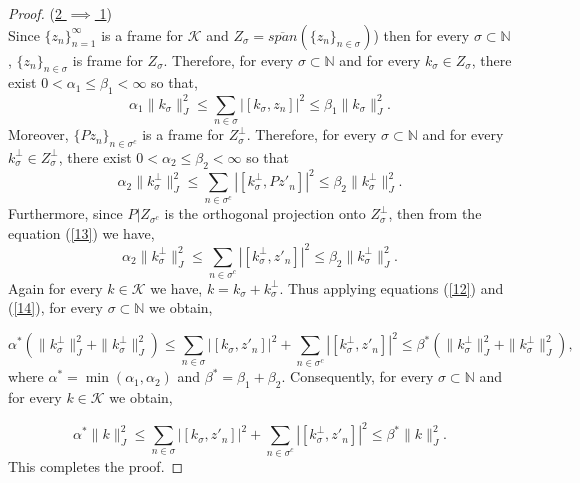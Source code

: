 \documentclass[10pt,a4paper]{amsart}
\begin{document}
\begin{proof}
	\noindent  (\underline{2 $\implies$ 1})\\
	Since $\{z_n\}_{n=1}^\infty$ is a frame  for $\mathcal{K}$ and $ Z_\sigma = \overline{span}(\{z_n\}_{n\in \sigma})$) then for every $\sigma \subset\mathbb{N}$,
	$\{z_n\}_{n\in \sigma}$ is frame for $Z_\sigma.$
	Therefore, for every $\sigma\subset \mathbb{N}$ and for every $k_\sigma \in Z_\sigma$, there exist $0<\alpha_1\leq \beta_1< \infty$ so that, 
	\begin{equation}\label{12}
	\alpha_1 \|k_\sigma\|_{J}^2 \leq \sum\limits_{n \in \sigma} |[k_\sigma, z_n]|^2  \leq \beta_1 \|k_\sigma\|_{J}^2.
	\end{equation}
	Moreover, $\{Pz_n\}_{n \in \sigma^c}$ is a frame for $Z^\perp_{\sigma}.$ Therefore, for every $\sigma\subset \mathbb{N}$ and for every $k^\perp_{\sigma} \in Z^\perp_\sigma$, there exist $0<\alpha_2\leq \beta_2< \infty$ so that
	\begin{equation}\label{13}
		\alpha_2\|k_\sigma^\perp\|_{J}^2 \leq \sum\limits_{n \in \sigma^c} |[k_\sigma^\perp, Pz'_n]|^2  \leq \beta_2 \|k_\sigma^\perp\|_{J}^2.
	\end{equation}
		Furthermore, since $P|Z_{\sigma^c}$ is the orthogonal projection  onto $Z^\perp_{\sigma}$, then from the equation (\ref{13}) we have,
		\begin{equation}\label{14}
		\alpha_2\|k_\sigma^\perp\|_{J}^2 \leq \sum\limits_{n \in \sigma^c} |[k_\sigma^\perp, z'_n]|^2  \leq \beta_2 \|k_\sigma^\perp\|_{J}^2.
	\end{equation}
	Again for every $k \in \mathcal{K}$ we have, $k = k_\sigma + k^\perp_\sigma$.
	Thus applying equations (\ref{12}) and (\ref{14}), for every $\sigma\subset \mathbb{N}$ we obtain,
	
	$$\alpha^*(\|k_\sigma^\perp\|_{J}^2 +\|k_\sigma^\perp\|_{J}^2 )\leq \sum\limits_{n \in \sigma} |[k_\sigma, z'_n]|^2 +\sum\limits_{n \in \sigma^c} |[k_\sigma^\perp, z'_n]|^2  \leq \beta^* (\|k_\sigma^\perp\|_{J}^2 +\|k_\sigma^\perp\|_{J}^2),$$
	where $\alpha^* = \min (\alpha_1, \alpha_2)$	and $\beta^* = \beta_1 + \beta_2$. Consequently, for every $\sigma\subset \mathbb{N}$ and for every $k \in \mathcal{K}$ we obtain,
	
	$$\alpha^*\|k\|_{J}^2  \leq \sum\limits_{n \in \sigma} |[k_\sigma, z'_n]|^2 +\sum\limits_{n \in \sigma^c} |[k_\sigma^\perp, z'_n]|^2  \leq \beta^* \|k\|_{J}^2.$$
This completes the proof.	
\end{proof}
\end{document}
